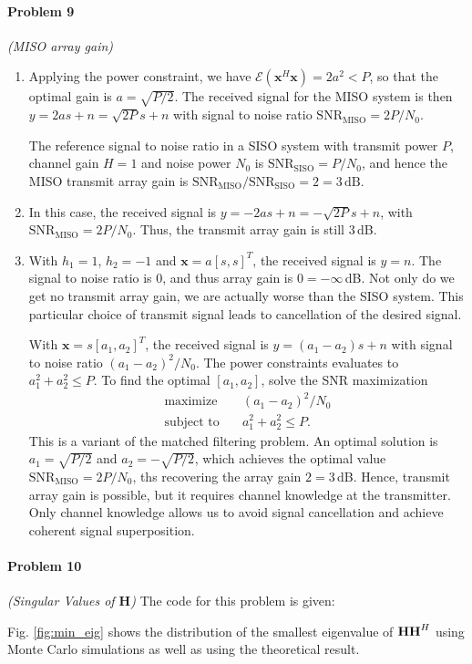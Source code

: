 \documentclass[12pt]{article}
\begin{document}
\paragraph{Problem 9} {\it (MISO array gain)} \quad
\begin{enumerate}
\item Applying the power constraint, we have $\mathcal E(\mathbf x^H \mathbf x)=2a^2<P$, so that the optimal gain is $a=\sqrt{P/2}$. The received signal for the MISO system is then $y=2as+n=\sqrt{2P}s+n$ with signal to noise ratio $\mathrm{SNR}_\text{MISO}=2P/N_0$.

The reference signal to noise ratio in a SISO system with transmit power $P$, channel gain $H=1$ and noise power $N_0$ is $\mathrm{SNR}_\text{SISO}=P/N_0$, and hence the MISO transmit array gain is $\mathrm{SNR}_\text{MISO} / \mathrm{SNR}_\text{SISO} = 2 = 3\,\text{dB}$.

\item In this case, the received signal is $y=-2as+n=-\sqrt{2P}s+n$, with $\mathrm{SNR}_\text{MISO}=2P/N_0$. Thus, the transmit array gain is still $3$\,dB.

\item With $h_1=1$,  $h_2=-1$ and $\mathbf x = a [s,s]^T$, the received signal is $y=n$. The signal to noise ratio is $0$, and thus array gain is $0=-\infty$\,dB. Not only do we get no transmit array gain, we are actually worse than the SISO system. This particular choice of transmit signal leads to cancellation of the desired signal.

With   $\mathbf x = s[a_1,a_2]^T$, the received signal is $y=(a_1-a_2)s+n$ with signal to noise ratio $(a_1-a_2)^2/N_0$. The power constraints evaluates to  $a_1^2+a_2^2\leq P$. To find the optimal $[a_1,a_2]$, solve the SNR maximization
\begin{align*}
	\text{maximize} &\quad (a_1-a_2)^2 / N_0\\
	\text{subject to} &\quad a_1^2+a_2^2\leq P.
\end{align*} 
This is a variant of the matched filtering problem. An optimal solution is $a_1=\sqrt{P/2}$ and $a_2=-\sqrt{P/2}$, which achieves the optimal value $\mathrm{SNR}_\text{MISO}=2P/N_0$, ths recovering the array gain $2=3$\,dB. Hence, transmit array gain is possible, but it requires channel knowledge at the transmitter. Only channel knowledge allows us to avoid signal cancellation and achieve coherent signal superposition.
\end{enumerate}

\paragraph{Problem 10}  {\it (Singular Values of $\mathbf H$) } 
The code for this problem is given:
\begin{footnotesize}

\end{footnotesize}
Fig. \ref{fig:min_eig} shows the distribution of the smallest
eigenvalue of ${\bf HH}^H$ using Monte Carlo simulations as well
as using the theoretical result.
\end{document}
